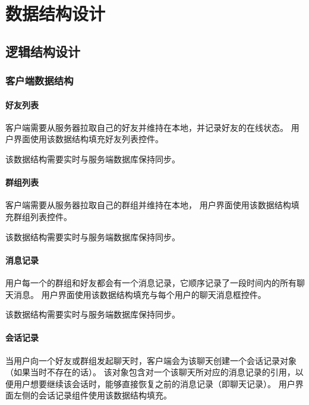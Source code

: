 \chapter{数据结构设计}
\section{逻辑结构设计}

\subsection{客户端数据结构}

\subsubsection{好友列表}
客户端需要从服务器拉取自己的好友并维持在本地，并记录好友的在线状态。
用户界面使用该数据结构填充好友列表控件。

该数据结构需要实时与服务端数据库保持同步。

\subsubsection{群组列表}
客户端需要从服务器拉取自己的群组并维持在本地，
用户界面使用该数据结构填充群组列表控件。

该数据结构需要实时与服务端数据库保持同步。

\subsubsection{消息记录}
用户每一个的群组和好友都会有一个消息记录，它顺序记录了一段时间内的所有聊天消息。
用户界面使用该数据结构填充与每个用户的聊天消息框控件。

该数据结构需要实时与服务端数据库保持同步。

\subsubsection{会话记录}
当用户向一个好友或群组发起聊天时，客户端会为该聊天创建一个会话记录对象（如果当时不存在的话）。
该对象包含对一个该聊天所对应的消息记录的引用，以便用户想要继续该会话时，能够直接恢复之前的消息记录（即聊天记录）。
用户界面左侧的会话记录组件使用该数据结构填充。

